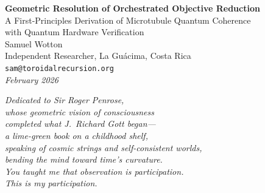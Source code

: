 \documentclass[12pt,a4paper]{article}
\theoremstyle{plain}
\theoremstyle{definition}
\begin{document}

\begin{center}
{\LARGE\bfseries Geometric Resolution of Orchestrated Objective Reduction}\\[0.8em]
{\Large A First-Principles Derivation of Microtubule Quantum Coherence\\
with Quantum Hardware Verification}\\[1.5em]

{\large Samuel Wotton}\\[0.3em]
{\small Independent Researcher, La Gu\'acima, Costa Rica}\\[0.3em]
{\small\texttt{sam@toroidalrecursion.org}}\\[2em]

\textit{February 2026}
\end{center}

\vspace{1.5em}

\begin{center}
\begin{minipage}{0.85\textwidth}
\begin{center}
\textit{Dedicated to Sir Roger Penrose,}\\
\textit{whose geometric vision of consciousness}\\
\textit{completed what J.~Richard Gott began---}\\
\textit{a lime-green book on a childhood shelf,}\\
\textit{speaking of cosmic strings and self-consistent worlds,}\\
\textit{bending the mind toward time's curvature.}\\
[0.5em]
\textit{You taught me that observation is participation.}\\
\textit{This is my participation.}
\end{center}
\end{minipage}
\end{center}

\vspace{2em}
\end{document}
